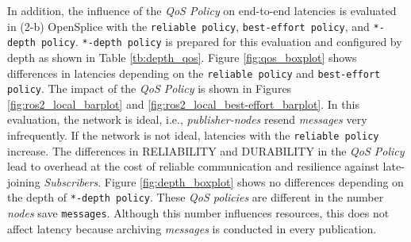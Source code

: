\documentclass{sig-alternate-05-2015}
\begin{document}
In addition, the influence of the \emph{QoS Policy} on end-to-end latencies is evaluated in (2-b) OpenSplice with the \texttt{reliable policy}, \texttt{best-effort policy}, and \texttt{*-depth policy}.
\texttt{*-depth policy} is prepared for this evaluation and configured by depth as shown in Table \ref{tb:depth_qos}.
Figure \ref{fig:qos_boxplot} shows differences in latencies depending on the \texttt{reliable policy} and \texttt{best-effort policy}.
The impact of the \emph{QoS Policy} is shown in Figures \ref{fig:ros2_local_barplot} and \ref{fig:ros2_local_best-effort_barplot}.
In this evaluation, the network is ideal, i.e., \emph{publisher-nodes} resend \emph{messages} very infrequently.
If the network is not ideal, latencies with the \texttt{reliable policy} increase.
The differences in RELIABILITY and DURABILITY in the \emph{QoS Policy} lead to overhead at the cost of reliable communication and resilience against late-joining \emph{Subscribers}.
Figure \ref{fig:depth_boxplot} shows no differences depending on the depth of \texttt{*-depth policy}.
These \emph{QoS policies} are different in the number \emph{nodes} save \texttt{messages}.
Although this number influences resources, this does not affect latency because archiving \emph{messages} is conducted in every publication.
\end{document}
